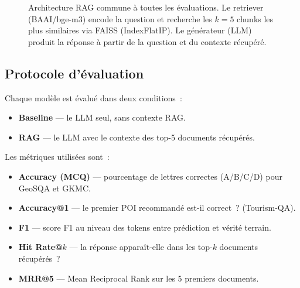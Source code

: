\documentclass[12pt,a4paper]{article}
\begin{document}
\begin{figure}[H]
\centering
{}
\caption{Architecture RAG commune \`a toutes les \'evaluations. Le retriever (BAAI/bge-m3) encode la question et recherche les $k=5$ chunks les plus similaires via FAISS (IndexFlatIP). Le g\'en\'erateur (LLM) produit la r\'eponse \`a partir de la question et du contexte r\'ecup\'er\'e.}
\label{fig:pipeline}
\end{figure}

\subsection{Protocole d'\'evaluation}

Chaque mod\`ele est \'evalu\'e dans deux conditions~:
\begin{itemize}[leftmargin=*]
    \item \textbf{Baseline} --- le LLM seul, sans contexte RAG.
    \item \textbf{RAG} --- le LLM avec le contexte des top-5 documents r\'ecup\'er\'es.
\end{itemize}

Les m\'etriques utilis\'ees sont~:
\begin{itemize}[leftmargin=*]
    \item \textbf{Accuracy (MCQ)} --- pourcentage de lettres correctes (A/B/C/D) pour GeoSQA et GKMC.
    \item \textbf{Accuracy@1} --- le premier POI recommand\'e est-il correct~? (Tourism-QA).
    \item \textbf{F1} --- score F1 au niveau des tokens entre pr\'ediction et v\'erit\'e terrain.
    \item \textbf{Hit Rate@$k$} --- la r\'eponse appara\^it-elle dans les top-$k$ documents r\'ecup\'er\'es~?
    \item \textbf{MRR@5} --- Mean Reciprocal Rank sur les 5 premiers documents.
\end{itemize}
\end{document}
